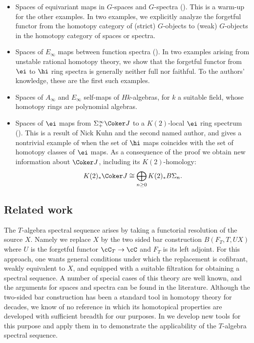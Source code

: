 \documentclass[leqno,oneside,english]{elsarticle}
\begin{document}
\begin{itemize}
\item Spaces of equivariant maps in $G$-spaces and $G$-spectra
  ().  This is a warm-up for the other examples.
  In two examples, we explicitly analyze the forgetful functor from the homotopy
  category of (strict) $G$-objects to (weak) $G$-objects in the
  homotopy category of spaces or spectra.

\item Spaces of $E_{\infty}$ maps between function spectra
  ().  In two examples arising from unstable rational
  homotopy theory, we show that the forgetful functor from $\ei$ to $\hi$
  ring spectra is generally neither full nor faithful.  To the authors'
  knowledge, these are the first such examples.
  
\item  Spaces of $A_\infty$ and $E_{\infty}$ self-maps of 
$Hk$-algebras, for $k$ a suitable field, whose homotopy rings are
polynomial algebras.

\item Spaces of $\ei$ maps from $\Sigma^{\infty}_+\Coker J$ to a
  $K(2)$-local $\ei$ ring spectrum ().  This is a
  result of Nick Kuhn and the second named author, and gives
  a nontrivial example of when the set of $\hi$ maps coincides with the
  set of homotopy classes of $\ei$ maps.  As a consequence of the
  proof we obtain new information about $\Coker J$, including its
  $K(2)$-homology:
  \[
  K(2)_*\Coker J \cong \bigoplus_{n\geq 0}K(2)_*B\Sigma_n. 
  \]
\end{itemize}

\subsection*{Related work} 
The $T$-algebra spectral sequence arises by taking a functorial
resolution of the source $X$. Namely we replace $X$ by the two sided
bar construction $B(F_T,T,UX)$ where $U$ is the forgetful functor
$\cC_T\rightarrow \cC$ and $F_T$ is its left adjoint. For this
approach, one wants general conditions under which the replacement is
cofibrant, weakly equivalent to $X$, and equipped with a suitable
filtration for obtaining a spectral sequence.  A number of special
cases of this theory are well known, and the arguments for spaces and
spectra can be found in the literature.  Although the two-sided bar
construction has been a standard tool in homotopy theory for decades,
we know of no reference in which its homotopical properties
are developed with sufficient breadth for our purposes.  In 
 we develop new tools for
this purpose and apply them in  to
demonstrate the applicability of the $T$-algebra spectral sequence. 
\end{document}
